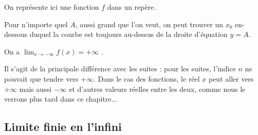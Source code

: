 \documentclass[11pt,fleqn, openany]{book} %
\begin{document}
\begin{example}
 On représente ici une fonction $f$ dans un repère.
 
\begin{minipage}{0.55\linewidth}
 Pour n'importe quel $A$, aussi grand que l'on veut, on peut trouver un $x_0$ en-dessous duquel la courbe est toujours au-dessus de la droite d'équation $y=A$. 

On a  $\displaystyle \lim_{x \to -\infty} f(x)=+\infty$ .

\end{minipage}\hfill\begin{minipage}{0.35\linewidth}
\begin{center}
\end{center}
\end{minipage}
\end{example}


Il s'agit de la principale différence avec les suites : pour les suites, l'indice $n$ ne pouvait que tendre vers $+\infty$. Dans le cas des fonctions, le réel $x$ peut aller vers $+\infty$ mais aussi $-\infty$ et d'autres valeurs réelles entre les deux, comme nous le verrons plus tard dans ce chapitre...


\subsection{Limite finie en l'infini}
\end{document}
